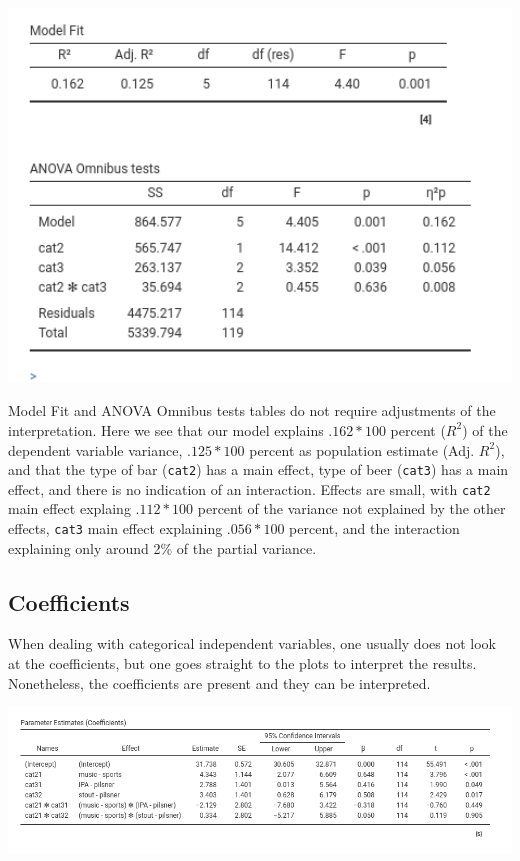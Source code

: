 \documentclass[
]{book}
\begin{document}
\includegraphics[width=6.44in]{bookletpics/2_anova_output2}

{Model Fit} and {ANOVA Omnibus tests} tables do not require adjustments of the interpretation. Here we see that our model explains \(.162*100\) percent (\(R^2\)) of the dependent variable variance, \(.125*100\) percent as population estimate (Adj. \(R^2\)), and that the type of bar (\texttt{cat2}) has a main effect, type of beer (\texttt{cat3}) has a main effect, and there is no indication of an interaction. Effects are small, with \texttt{cat2} main effect explaing \(.112*100\) percent of the variance not explained by the other effects, \texttt{cat3} main effect explaining \(.056*100\) percent, and the interaction explaining only around 2\% of the partial variance.

\hypertarget{dummies}{%
\subsection{Coefficients}\label{dummies}}

When dealing with categorical independent variables, one usually does not look at the coefficients, but one goes straight to the plots to interpret the results. Nonetheless, the coefficients are present and they can be interpreted.

\includegraphics[width=12.38in]{bookletpics/2_anova_output3}
\end{document}
